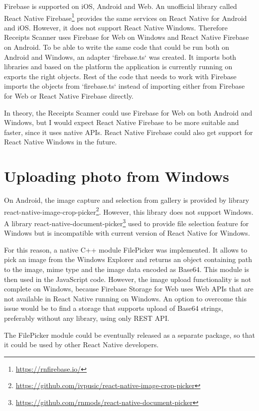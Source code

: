 \documentclass[
  digital, %
  table,   %
  oneside, %
  lof,     %
  lot,     %
]{fithesis3}
\begin{document}
Firebase is supported on iOS, Android and Web. An unofficial library called React Native Firebase\footnote{\url{https://rnfirebase.io/}} provides the same services on React Native for Android and iOS. However, it does not support React Native Windows. Therefore Receipts Scanner uses Firebase for Web on Windows and React Native Firebase on Android. To be able to write the same code that could be run both on Android and Windows, an adapter `firebase.ts` was created. It imports both libraries and based on the platform the application is currently running on exports the right objects. Rest of the code that needs to work with Firebase imports the objects from `firebase.ts` instead of importing either from Firebase for Web or React Native Firebase directly.

In theory, the Receipts Scanner could use Firebase for Web on both Android and Windows, but I would expect React Native Firebase to be more suitable and faster, since it uses native APIs. React Native Firebase could also get support for React Native Windows in the future.

\chapter{Uploading photo from Windows}
On Android, the image capture and selection from gallery is provided by library react-native-image-crop-picker\footnote{\url{https://github.com/ivpusic/react-native-image-crop-picker}}. However, this library does not support Windows. A library react-native-document-picker\footnote{\url{https://github.com/rnmods/react-native-document-picker}} used to provide file selection feature for Windows but is incompatible with current version of React Native for Windows. 

For this reason, a native C++ module FilePicker was implemented. It allows to pick an image from the Windows Explorer and returns an object containing path to the image, mime type and the image data encoded as Base64. This module is then used in the JavaScript code. However, the image upload functionality is not complete on Windows, because Firebase Storage for Web uses Web APIs that are not available in React Native running on Windows. An option to overcome this issue would be to find a storage that supports upload of Base64 strings, preferably without any library, using only REST API.

The FilePicker module could be eventually released as a separate package, so that it could be used by other React Native developers.
\end{document}
